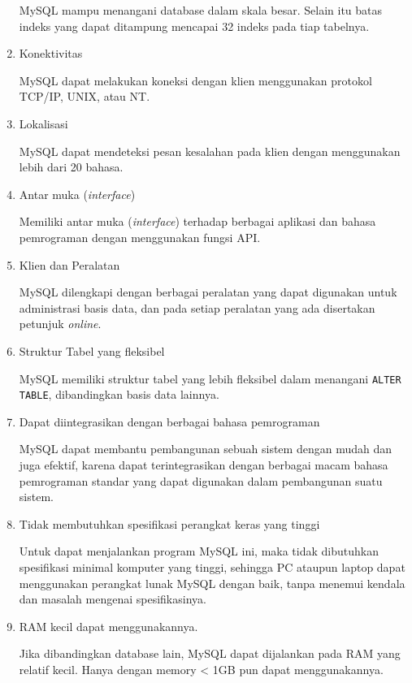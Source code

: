 \begin{enumerate}
			MySQL mampu menangani database dalam skala besar. Selain itu batas indeks yang dapat ditampung mencapai 32 indeks pada tiap tabelnya.
			
			\item Konektivitas
			
			MySQL dapat melakukan koneksi dengan klien menggunakan protokol TCP/IP, UNIX, atau NT.
			
			\item Lokalisasi
			
			MySQL dapat mendeteksi pesan kesalahan pada klien dengan menggunakan lebih dari 20 bahasa. 
			
			\item Antar muka (\textit{interface})
			
			Memiliki antar muka (\textit{interface}) terhadap berbagai aplikasi dan bahasa pemrograman dengan menggunakan fungsi API.
			
			\item Klien dan Peralatan
			
			MySQL dilengkapi dengan berbagai peralatan yang dapat digunakan untuk administrasi basis data, dan pada setiap peralatan yang ada disertakan petunjuk \textit{online}.
			
			\item Struktur Tabel yang fleksibel
			
			MySQL memiliki struktur tabel yang lebih fleksibel dalam menangani \texttt{ALTER TABLE}, dibandingkan basis data lainnya.
			
			\item Dapat diintegrasikan dengan berbagai bahasa pemrograman
			
			MySQL dapat membantu pembangunan sebuah sistem dengan mudah dan juga efektif, karena dapat terintegrasikan dengan berbagai macam bahasa pemrograman standar yang dapat digunakan dalam pembangunan suatu sistem.
			
			\item Tidak membutuhkan spesifikasi perangkat keras yang tinggi
			
			Untuk dapat menjalankan program MySQL ini, maka tidak dibutuhkan spesifikasi minimal komputer yang tinggi, sehingga PC ataupun laptop dapat menggunakan perangkat lunak MySQL dengan baik, tanpa menemui kendala dan masalah mengenai spesifikasinya.
			
			\item RAM kecil dapat menggunakannya.
			
			Jika dibandingkan database lain, MySQL dapat dijalankan pada RAM yang relatif kecil. Hanya dengan memory < 1GB pun dapat menggunakannya.
			\end{enumerate}
			
